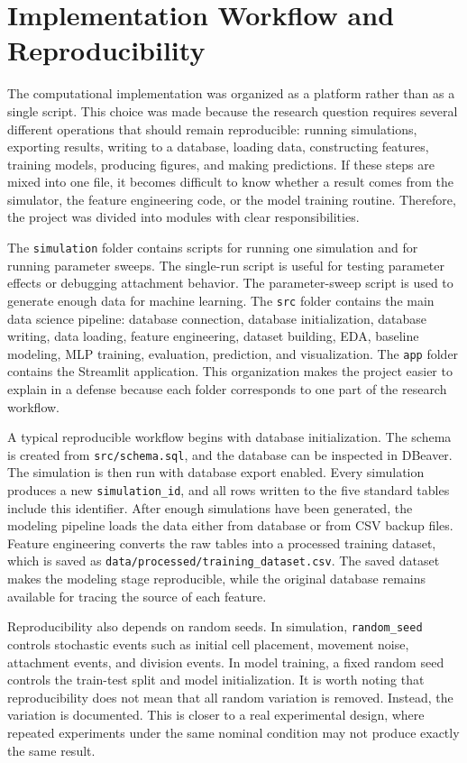 \documentclass[12pt,a4paper,oneside]{report}
\begin{document}
\section{Implementation Workflow and Reproducibility}
The computational implementation was organized as a platform rather than as a single script. This choice was made because the research question requires several different operations that should remain reproducible: running simulations, exporting results, writing to a database, loading data, constructing features, training models, producing figures, and making predictions. If these steps are mixed into one file, it becomes difficult to know whether a result comes from the simulator, the feature engineering code, or the model training routine. Therefore, the project was divided into modules with clear responsibilities.

The \texttt{simulation} folder contains scripts for running one simulation and for running parameter sweeps. The single-run script is useful for testing parameter effects or debugging attachment behavior. The parameter-sweep script is used to generate enough data for machine learning. The \texttt{src} folder contains the main data science pipeline: database connection, database initialization, database writing, data loading, feature engineering, dataset building, EDA, baseline modeling, MLP training, evaluation, prediction, and visualization. The \texttt{app} folder contains the Streamlit application. This organization makes the project easier to explain in a defense because each folder corresponds to one part of the research workflow.

A typical reproducible workflow begins with database initialization. The schema is created from \texttt{src/schema.sql}, and the database can be inspected in DBeaver. The simulation is then run with database export enabled. Every simulation produces a new \texttt{simulation\_id}, and all rows written to the five standard tables include this identifier. After enough simulations have been generated, the modeling pipeline loads the data either from database or from CSV backup files. Feature engineering converts the raw tables into a processed training dataset, which is saved as \texttt{data/processed/training\_dataset.csv}. The saved dataset makes the modeling stage reproducible, while the original database remains available for tracing the source of each feature.

Reproducibility also depends on random seeds. In simulation, \texttt{random\_seed} controls stochastic events such as initial cell placement, movement noise, attachment events, and division events. In model training, a fixed random seed controls the train-test split and model initialization. It is worth noting that reproducibility does not mean that all random variation is removed. Instead, the variation is documented. This is closer to a real experimental design, where repeated experiments under the same nominal condition may not produce exactly the same result.
\end{document}
